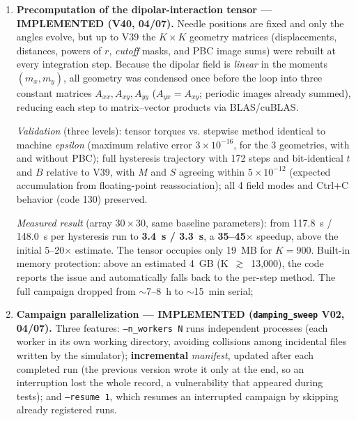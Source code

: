 \documentclass[11pt,a4paper]{article}
\newcommand{\code}[1]{\texttt{#1}}
\begin{document}
\begin{enumerate}
\item \textbf{Precomputation of the dipolar-interaction tensor --- IMPLEMENTED (V40, 04/07).} Needle positions are fixed and only the angles evolve, but up to V39 the $K \times K$ geometry matrices (displacements, distances, powers of $r$, \emph{cutoff} masks, and PBC image sums) were rebuilt at every integration step. Because the dipolar field is \emph{linear} in the moments $(m_x, m_y)$, all geometry was condensed once before the loop into three constant matrices $A_{xx}, A_{xy}, A_{yy}$ ($A_{yx} = A_{xy}$; periodic images already summed), reducing each step to matrix--vector products via BLAS/cuBLAS.

\emph{Validation} (three levels): tensor torques vs. stepwise method identical to machine \emph{epsilon} (maximum relative error $3 \times 10^{-16}$, for the 3 geometries, with and without PBC); full hysteresis trajectory with 172 steps and bit-identical $t$ and $B$ relative to V39, with $M$ and $S$ agreeing within $5 \times 10^{-12}$ (expected accumulation from floating-point reassociation); all 4 field modes and \mbox{Ctrl+C} behavior (code 130) preserved.

\emph{Measured result} (array $30\times30$, same baseline parameters): from 117.8~s / 148.0~s per hysteresis run to \textbf{3.4~s / 3.3~s}, a \textbf{35--45$\times$} speedup, above the initial 5--20$\times$ estimate. The tensor occupies only 19~MB for $K = 900$. Built-in memory protection: above an estimated 4~GB (K~$\gtrsim$~13,000), the code reports the issue and automatically falls back to the per-step method. The full campaign dropped from $\sim$7--8~h to $\sim$15~min serial;
\item \textbf{Campaign parallelization --- IMPLEMENTED (\code{damping\_sweep} V02, 04/07).} Three features: \code{--n\_workers~N} runs independent processes (each worker in its own working directory, avoiding collisions among incidental files written by the simulator); \textbf{incremental} \emph{manifest}, updated after each completed run (the previous version wrote it only at the end, so an interruption lost the whole record, a vulnerability that appeared during tests); and \code{--resume~1}, which resumes an interrupted campaign by skipping already registered runs.


\end{enumerate}
\end{document}
